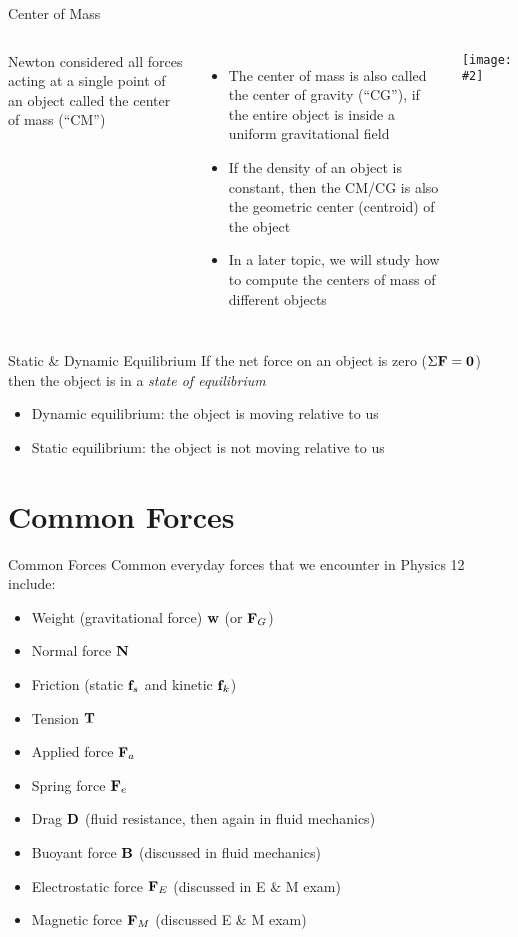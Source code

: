 \documentclass[12pt,compress,aspectratio=169]{beamer}
\newcommand{\pic}[2]{\texttt{[image: \#2]}}
\newcommand{\mb}[1]{\ensuremath\mathbf{#1}}
\begin{document}
\begin{frame}{Center of Mass}
  \vspace{.2in}
  \begin{columns}
    Newton considered all forces acting at a single point of an object called
    the center of mass (``CM'')
    \begin{itemize}
    \item The center of mass is also called the center of gravity (``CG''), if
      the entire object is inside a uniform gravitational field
    \item If the density of an object is constant, then the CM/CG is also the
      geometric center (centroid) of the object
    \item In a later topic, we will study how to compute the centers of mass of
      different objects
    \end{itemize}

    \pic{1}{graphics/cofm}
  \end{columns}
\end{frame}

\begin{frame}{Static \& Dynamic Equilibrium}
  If the net force on an object is zero ($\Sigma\mb{F}=\mb{0}$) then the
  object is in a \emph{state of equilibrium}
  \begin{itemize}
  \item Dynamic equilibrium: the object is moving relative to us
  \item Static equilibrium: the object is not moving relative to us
  \end{itemize}
\end{frame}


\section{Common Forces}

\begin{frame}{Common Forces}
  Common everyday forces that we encounter in Physics 12 include:
  \begin{itemize}
  \item Weight (gravitational force) $\mb{w}$ (or $\mb{F}_G$)
  \item Normal force $\mb{N}$
  \item Friction (static $\mb{f}_s$ and kinetic $\mb{f}_k$)
  \item Tension $\mb{T}$
  \item Applied force $\mb{F}_a$
  \item Spring force $\mb{F}_e$
  \item Drag $\mb{D}$ (fluid resistance, then again in fluid mechanics)
  \item Buoyant force $\mb{B}$ (discussed in fluid mechanics)
  \item Electrostatic force $\mb{F}_E$ (discussed in E \& M exam)
  \item Magnetic force $\mb{F}_M$ (discussed E \& M exam)
  \end{itemize}
\end{frame}
\end{document}
